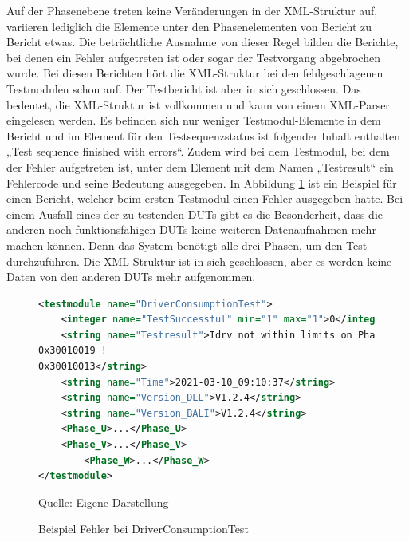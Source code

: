 Auf der Phasenebene treten keine Veränderungen in der \ac{XML}-Struktur auf, variieren lediglich die Elemente unter den
Phasenelementen von Bericht zu Bericht etwas.
Die beträchtliche Ausnahme von dieser Regel bilden die Berichte, bei denen ein Fehler aufgetreten ist oder sogar der
Testvorgang abgebrochen wurde. Bei diesen Berichten hört die \ac{XML}-Struktur bei den fehlgeschlagenen Testmodulen schon auf.
Der Testbericht ist aber in sich geschlossen. Das bedeutet, die \ac{XML}-Struktur ist vollkommen und kann von einem \ac{XML}-Parser eingelesen werden.
Es befinden sich nur weniger Testmodul-Elemente in dem Bericht und im Element für den Testsequenzstatus ist folgender Inhalt
enthalten „Test sequence finished with errors“. Zudem wird bei dem Testmodul, bei dem der Fehler aufgetreten ist, unter
dem Element mit dem Namen „Testresult“ ein Fehlercode und seine Bedeutung ausgegeben. In Abbildung \ref{fig: Beispiel Fehler bei DriverConsumptionTest} ist ein
Beispiel für einen Bericht, welcher beim ersten Testmodul einen Fehler ausgegeben hatte.
Bei einem Ausfall eines der zu testenden \ac{DUTs} gibt es die Besonderheit, dass die anderen noch funktionsfähigen \ac{DUTs}
keine weiteren Datenaufnahmen mehr machen können. Denn das System benötigt alle drei Phasen, um den Test durchzuführen.
Die \ac{XML}-Struktur ist in sich geschlossen, aber es werden keine Daten von den anderen \ac{DUTs} mehr aufgenommen.

\begin{figure}[H]
\centering
\begin{minipage}{0.95\textwidth}
\begin{lstlisting}[language=XML]
<testmodule name="DriverConsumptionTest">
	<integer name="TestSuccessful" min="1" max="1">0</integer>
	<string name="Testresult">Idrv not within limits on Phase U
0x30010019 !
0x30010013</string>
	<string name="Time">2021-03-10_09:10:37</string>
	<string name="Version_DLL">V1.2.4</string>
    <string name="Version_BALI">V1.2.4</string>
    <Phase_U>...</Phase_U>
    <Phase_V>...</Phase_V>
        <Phase_W>...</Phase_W>
</testmodule>
\end{lstlisting}
\end{minipage}
\caption{Beispiel Fehler bei DriverConsumptionTest}
\label{fig: Beispiel Fehler bei DriverConsumptionTest}
    {Quelle: Eigene Darstellung}
\end{figure}





